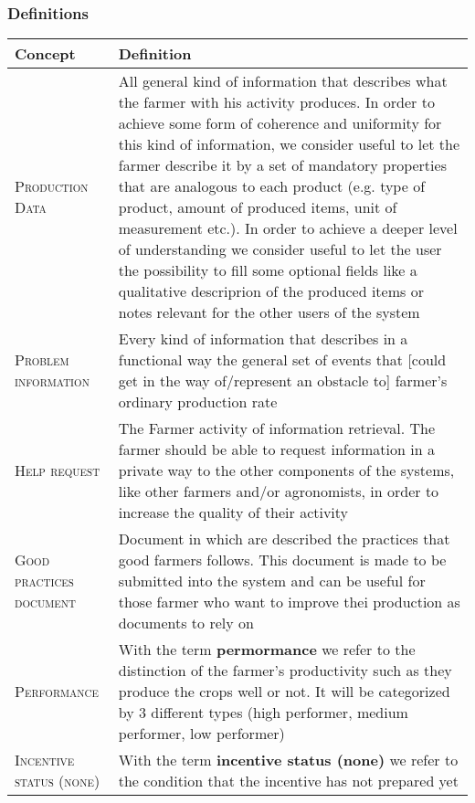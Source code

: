 \subsubsection{Definitions}
\begin{table}[H]
    \setlength\arrayrulewidth{1pt}
    \centering
    \begin{tabular}{|m{}|m{}|}
        \rowcolor{myblue}
        \hline
        \color{white}Concept & \color{white}Definition \\
        \hline
        \textsc{Production Data}     &   All general kind of information that describes what the farmer with his activity produces. In order to achieve some form of coherence and uniformity for this kind of information, we consider useful to let the farmer describe it by a set of mandatory properties that are analogous to each product (e.g. type of product, amount of produced items, unit of measurement etc.). In order to achieve a deeper level of understanding we consider useful to let the user the possibility to fill some optional fields like a qualitative descriprion of the produced items or notes relevant for the other users of the system \\
        \hline
        \textsc{Problem information}  &   Every kind of information that describes in a functional way the general set of events that [could get in the way of/represent an obstacle to] farmer's ordinary production rate \\
        \hline
        \textsc{Help request}     &   The Farmer activity of information retrieval. The farmer should be able to request information in a private way to the other components of the systems, like other farmers and/or agronomists, in order to increase the quality of their activity \\
        \hline
        \textsc{\nohyphens{Good  practices document}}     &   Document in which are described the practices that good farmers follows. This document is made to be submitted into the system and can be useful for those farmer who want to improve thei production as documents to rely on \\
        \hline
        \textsc{Performance}     &   With the term \textbf{permormance} we refer to the distinction of the farmer's productivity such as they produce the crops well or not. It will be categorized by 3 different types (high performer, medium performer, low performer) \\
        \hline
        \textsc{Incentive status (none)}  &   With the term \textbf{incentive status (none)} we refer to the condition that the incentive has not prepared yet \\

\end{tabular}
\end{table}
